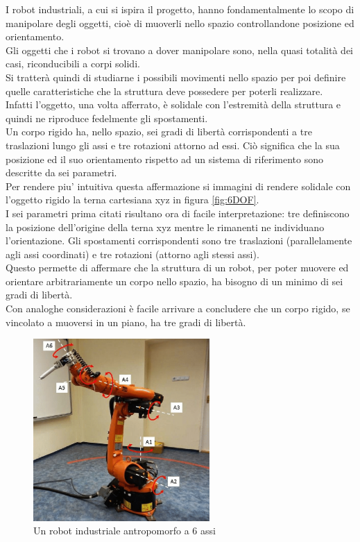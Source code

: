 \documentclass[%
corpo=11pt,
twoside,
 stile=classica,
oldstyle,
greek,%
]{toptesi}
\begin{document}
	 
	 I robot industriali, a cui si ispira il progetto, hanno fondamentalmente lo scopo di manipolare degli oggetti, cioè di muoverli nello spazio controllandone posizione ed orientamento.\\
	  Gli oggetti che i robot si trovano a dover manipolare sono, nella quasi totalità dei casi, riconducibili a corpi solidi. \\
	  Si tratterà quindi di studiarne i possibili movimenti nello spazio per poi definire quelle caratteristiche che la struttura deve possedere per poterli realizzare. \\
	  Infatti l'oggetto, una volta afferrato, è solidale con l'estremità della struttura e quindi ne riproduce fedelmente gli spostamenti. \\
	 Un corpo rigido ha, nello spazio, sei gradi di libertà corrispondenti a tre traslazioni lungo gli assi e tre rotazioni attorno ad essi. 
	 Ciò significa che la sua posizione ed il suo orientamento rispetto ad un sistema di riferimento sono descritte da sei parametri. \\
	 Per rendere piu' intuitiva questa affermazione si immagini di rendere solidale con l'oggetto rigido la terna cartesiana xyz in figura \ref{fig:6DOF}. \\
	 I sei parametri prima citati risultano ora di facile interpretazione: tre definiscono la posizione dell'origine della terna xyz mentre le rimanenti ne individuano l'orientazione. Gli spostamenti corrispondenti sono tre traslazioni (parallelamente agli assi coordinati) e tre rotazioni (attorno agli stessi assi).\\
	  Questo permette di affermare che la struttura di un robot, per poter muovere ed orientare arbitrariamente un corpo nello spazio, ha bisogno di un minimo di sei gradi di libertà. \\
	  Con analoghe considerazioni è facile arrivare a concludere che un corpo rigido, se vincolato a muoversi in un piano, ha tre gradi di libertà. 
	  
	 \begin{figure} [H]
	 	\centering
	 	\includegraphics[width=0.6\textwidth]{pictures/KUKA.png}
	 	\caption{Un robot industriale antropomorfo a 6 assi}
	 	\label{fig:KUKA}
	 \end{figure}
	 
\end{document}
